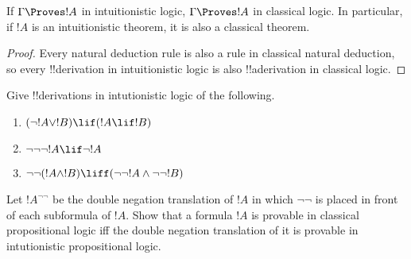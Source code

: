 \documentclass[../../../include/open-logic-section]{subfiles}
\begin{document}
\begin{prop}
  If $\Gamma \Proves !A$ in intuitionistic logic, $\Gamma \Proves !A$ in
  classical logic. In particular, if $!A$ is an intuitionistic
  theorem, it is also a classical theorem.
\end{prop}

\begin{proof}
  Every natural deduction rule is also a rule in classical natural
  deduction, so every !!{derivation} in intuitionistic logic is also
  !!a{derivation} in classical logic.
\end{proof}

\begin{prob}
  Give !!{derivation}s in intutionistic logic of the following.
  \begin{enumerate}
    \item $(\lnot !A \lor !B) \lif (!A \lif !B)$
    \item $\lnot\lnot\lnot !A \lif \lnot !A$
    \item $\lnot\lnot (!A \land !B) \liff (\lnot\lnot !A\land \lnot \lnot !B)$
  \end{enumerate}
\end{prob}

\begin{prob}
Let $!A^{\lnot \lnot}$ be the double negation translation of $!A$ in which $\lnot\lnot$ is placed in front of each subformula of $!A$. Show that a formula $!A$ is provable in classical propositional logic iff the double negation translation of it is provable in intutionistic propositional logic.
\end{prob}
\end{document}
